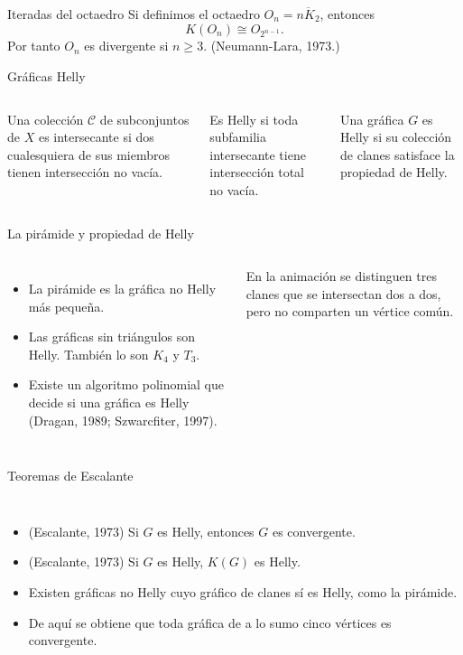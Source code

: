 \documentclass[aspectratio=169,10pt]{beamer}
\begin{document}
\begin{frame}{Iteradas del octaedro}
\centering
Si definimos el \alert{octaedro} $O_n=\overline{nK_2}$, entonces
\[
K(O_n)\cong O_{2^{n-1}}.
\]
Por tanto $O_n$ es divergente si $n\ge3$. (Neumann-Lara, 1973.)
\par\medskip
{}
\end{frame}

\begin{frame}{Gráficas Helly}
\begin{columns}[T,onlytextwidth]
\SmallText
Una colección $\mathcal{C}$ de subconjuntos de $X$ es \alert{intersecante} si dos cualesquiera de sus miembros tienen intersección no vacía.
\par\medskip
Es \alert{Helly} si toda subfamilia intersecante tiene intersección total no vacía.
\par\medskip
Una gráfica $G$ es \alert{Helly} si su colección de clanes satisface la propiedad de Helly.
\centering{}
\end{columns}
\end{frame}

\begin{frame}{La pirámide y propiedad de Helly}
\begin{columns}[T,onlytextwidth]
\SmallText
\begin{itemize}
\item La \alert{pirámide} es la gráfica no Helly más pequeña.
\item Las gráficas sin triángulos son Helly. También lo son $K_4$ y $T_3$.
\item Existe un algoritmo polinomial que decide si una gráfica es Helly (Dragan, 1989; Szwarcfiter, 1997).
\end{itemize}
En la animación se distinguen tres clanes que se intersectan dos a dos, pero no comparten un vértice común.
\centering{}
\end{columns}
\end{frame}

\begin{frame}{Teoremas de Escalante}
\begin{columns}[T,onlytextwidth]
\SmallText
\begin{itemize}
\item (Escalante, 1973) Si $G$ es Helly, entonces $G$ es convergente.
\item (Escalante, 1973) Si $G$ es Helly, $K(G)$ es Helly.
\item Existen gráficas no Helly cuyo gráfico de clanes sí es Helly, como la pirámide.
\item De aquí se obtiene que toda gráfica de a lo sumo cinco vértices es convergente.
\end{itemize}
\centering{}
\end{columns}
\end{frame}
\end{document}
